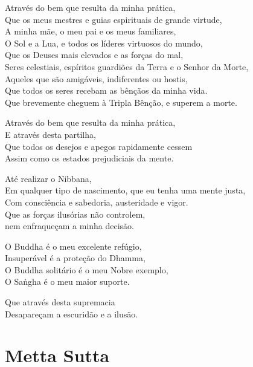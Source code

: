 Através do bem que resulta da minha prática,\\
Que os meus mestres e guias espirituais de grande virtude,\\
A minha mãe, o meu pai e os meus familiares,\\
O Sol e a Lua, e todos os líderes virtuosos do mundo,\\
Que os Deuses mais elevados e as forças do mal,\\
Seres celestiais, espíritos guardiões da Terra e o Senhor da Morte,\\
Aqueles que são amigáveis, indiferentes ou hostis,\\
Que todos os seres recebam as bênçãos da minha vida.\\
Que brevemente cheguem à Tripla Bênção, e superem a morte.

Através do bem que resulta da minha prática,\\
E através desta partilha,\\
Que todos os desejos e apegos rapidamente cessem\\
Assim como os estados prejudiciais da mente.

Até realizar o Nibbana,\\
Em qualquer tipo de nascimento, que eu tenha uma mente justa,\\
Com consciência e sabedoria, austeridade e vigor.\\
Que as forças ilusórias não controlem,\\
nem enfraqueçam a minha decisão.

O Buddha é o meu excelente refúgio,\\
Insuperável é a proteção do Dhamma,\\
O Buddha solitário é o meu Nobre exemplo,\\
O Saṅgha é o meu maior suporte.

Que através desta supremacia\\
Desapareçam a escuridão e a ilusão.

\chapter*[Metta Sutta]{Metta Sutta}

\delegateSetUseNext


\begin{leader}
\end{leader}

